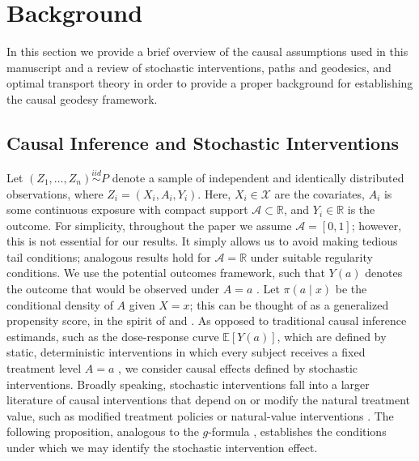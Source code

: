 \documentclass[11pt,twoside]{article}
\theoremstyle{definition}
\theoremstyle{remark}
\begin{document}
\section{Background} \label{notation_section}

In this section we provide a brief overview of the causal assumptions used in this manuscript and a review of stochastic interventions, paths and geodesics, and optimal transport theory in order to provide a proper background for establishing the causal geodesy framework.

\subsection{Causal Inference and Stochastic Interventions} \label{causal_background}
Let $(Z_1, \ldots, Z_n) \overset{iid}{\sim} P$ denote a sample of independent and identically distributed observations, where $Z_i = (X_i, A_i, Y_i)$. Here, $X_i \in \mathcal{X}$ are the covariates, $A_i$ is some continuous exposure with compact support $\mathcal{A} \subset \mathbb{R}$, and $Y_i \in \mathbb{R}$ is the outcome. For simplicity, throughout the paper we assume $\mathcal{A} = [0, 1]$; however, this is not essential for our results. It simply allows us to avoid making tedious tail conditions; analogous results hold for $\mathcal{A} = \mathbb{R}$ under suitable regularity conditions. We use the potential outcomes framework, such that $Y(a)$ denotes the outcome that would be observed under $A = a$ \citep{rubin1974estimating}. Let $\pi(a \! \mid \! x)$ be the conditional density of $A$ given $X = x$; this can be thought of as a generalized propensity score, in the spirit of \cite{imai_vandyk2004} and \cite{hirano2004propensity}. As opposed to traditional causal inference estimands, such as the dose-response curve $\mathbb{E}[Y(a)]$, which are defined by static, deterministic interventions in which every subject receives a fixed treatment level $A = a$ \citep{kennedy2017cte}, we consider causal effects defined by stochastic interventions. Broadly speaking, stochastic interventions fall into a larger literature of causal interventions that depend on or modify the natural treatment value, such as modified treatment policies \citep{haneuse2013, Diaz03042023} or natural-value interventions \citep{YoungHernanRobins+2014+1+19}. The following proposition, analogous to the $g$-formula \citep{ROBINS19861393}, establishes the conditions under which we may identify the stochastic intervention effect.
\end{document}
